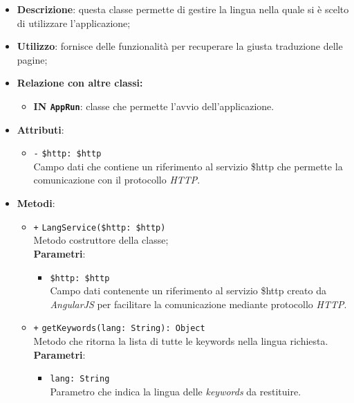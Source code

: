 \begin{itemize}
	\item \textbf{Descrizione}: questa classe permette di gestire la lingua nella quale si è scelto di utilizzare l'applicazione;
	\item \textbf{Utilizzo}: fornisce delle funzionalità per recuperare la giusta traduzione delle pagine;
	\item \textbf{Relazione con altre classi:}
	\begin{itemize}
		\item \textbf{IN \texttt{AppRun}}: classe che permette l'avvio dell'applicazione.
	\end{itemize}
	\item \textbf{Attributi}:
	\begin{itemize}
		\item \texttt{-} \texttt{\$http: \$http} \\ Campo dati che contiene un riferimento al servizio \$http che permette la comunicazione con il protocollo \textit{HTTP}.
	\end{itemize}
	\item \textbf{Metodi}:
	\begin{itemize}
		\item \texttt{+} \texttt{LangService(\$http: \$http)} \\ Metodo costruttore della classe; \\
		\textbf{Parametri}:
		\begin{itemize}
			\item \texttt{\$http: \$http} \\ Campo dati contenente un riferimento al servizio \$http creato da \textit{AngularJS} per facilitare la comunicazione mediante protocollo \textit{HTTP}.
		\end{itemize}
		\item \texttt{+} \texttt{getKeywords(lang: String): Object} \\Metodo che ritorna la lista di tutte le keywords nella lingua richiesta.\\
		\textbf{Parametri}:
		\begin{itemize}
			\item \texttt{lang: String} \\ Parametro che indica la lingua delle \textit{keywords} da restituire.
		\end{itemize}
	\end{itemize}
\end{itemize}
